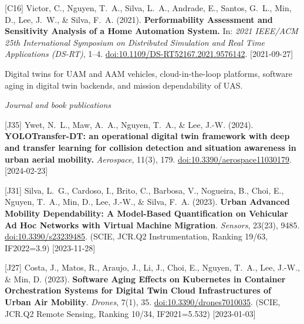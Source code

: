 {\begin{pubenumerate}
\item {\color{green}[C16]} Victor, C., Nguyen, T.\ A., Silva, L.\ A., Andrade, E., Santos, G.\ L., Min, D., Lee, J.\ W., \& Silva, F.\ A. (2021). \textbf{Performability Assessment and Sensitivity Analysis of a Home Automation System.} In: \textit{2021 IEEE/ACM 25th International Symposium on Distributed Simulation and Real Time Applications (DS-RT)}, 1--4. \href{https://doi.org/10.1109/DS-RT52167.2021.9576142}{doi:10.1109/DS-RT52167.2021.9576142}. [2021-09-27]

\end{pubenumerate}


Digital twins for UAM and AAM vehicles, cloud-in-the-loop platforms, software aging in digital twin backends, and mission dependability of UAS.

\textit{Journal and book publications}
\begin{pubenumerate}
\item {\color{blue}[J35]} Ywet, N.\ L., Maw, A.\ A., Nguyen, T.\ A., \& Lee, J.-W. (2024). 
  \textbf{YOLOTransfer-DT: an operational digital twin framework with deep and transfer learning for collision detection and situation awareness in urban aerial mobility.} 
  \textit{Aerospace}, 11(3), 179. 
  \href{https://doi.org/10.3390/aerospace11030179}{doi:10.3390/aerospace11030179}. [2024-02-23]

\item {\color{blue}[J31]} Silva, L.\ G., Cardoso, I., Brito, C., Barbosa, V., Nogueira, B., Choi, E., Nguyen, T.\ A., Min, D., Lee, J.-W., \& Silva, F.\ A. (2023). \textbf{Urban Advanced Mobility Dependability: A Model-Based Quantification on Vehicular Ad Hoc Networks with Virtual Machine Migration}. \textit{Sensors}, 23(23), 9485. \href{https://doi.org/10.3390/s23239485}{doi:10.3390/s23239485}. (SCIE, JCR.Q2 Instrumentation, Ranking 19/63, IF2022=3.9) [2023-11-28]

\item {\color{blue}[J27]} Costa, J., Matos, R., Araujo, J., Li, J., Choi, E., Nguyen, T.\ A., Lee, J.-W., \& Min, D. (2023). \textbf{Software Aging Effects on Kubernetes in Container Orchestration Systems for Digital Twin Cloud Infrastructures of Urban Air Mobility}. \textit{Drones}, 7(1), 35. \href{https://doi.org/10.3390/drones7010035}{doi:10.3390/drones7010035}. (SCIE, JCR.Q2 Remote Sensing, Ranking 10/34, IF2021=5.532) [2023-01-03]


\end{pubenumerate}}
